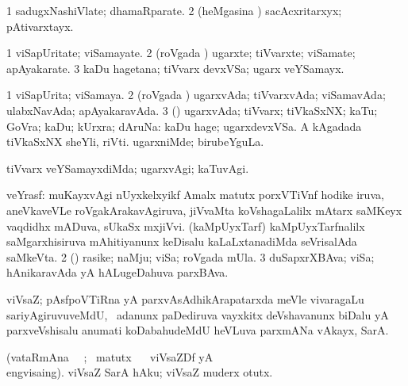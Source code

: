 \bentry 
{} 
\gl{\nA}
\expl{}
\bmng
\bnum
\num{1} sadugxNashiVlate; dhamaRparate. 
\num{2} (heMgasina \vi) sacAcxritarxyx; pAtivarxtayx. 
\enum
\emng
\eentry

\bentry 
{} 
\gl{\nA}
\expl{}
\bmng
\bnum
\num{1} viSapUritate; viSamayate. 
\num{2} (roVgada \vi) ugarxte; tiVvarxte; viSamate; apAyakarate. 
\num{3} kaDu hagetana; tiVvarx devxVSa; ugarx veYSamayx. 
\enum
\emng
\eentry

\bentry
{} 
\gl{\gu}
\expl{}
\bmng
\bnum
\num{1} viSapUrita; viSamaya. 
\num{2} (roVgada \vi) ugarxvAda; tiVvarxvAda; viSamavAda; ulabxNavAda; apAyakaravAda. 
\num{3} (\rUpa) ugarxvAda; tiVvarx; tiVkaSxNX; kaTu; GoVra; kaDu; kUrxra; dAruNa:  kaDu hage; ugarxdevxVSa.  A kAgadada tiVkaSxNX sheYli, riVti.  ugarxniMde; birubeYguLa. 
\enum
\emng
\eentry

\bentry 
{} 
\gl{\kirxvi}
\expl{}
\bmng
 tiVvarx veYSamayxdiMda; ugarxvAgi; kaTuvAgi. 
\emng
\eentry

\bentry 
{} 
\gl{\nA}
\expl{}
\bmng
\bnum
{} 
\banum
{} veYrasf: muKayxvAgi nUyxkelxyikf Amalx matutx porxVTiVnf hodike iruva, aneVkaveVLe roVgakArakavAgiruva, jiVvaMta koVshagaLalilx mAtarx saMKeyx vaqdidhx mADuva, sUkaSx mxjiVvi. 
 (kaMpUyxTarf) kaMpUyxTarfnalilx saMgarxhisiruva mAhitiyanunx keDisalu kaLaLxtanadiMda seVrisalAda saMkeVta. 
\eanum
\numie
\num{2} (\pArxparx) rasike; naMju; viSa; roVgada mUla. 
\num{3} duSapxrXBAva; viSa; hAnikaravAda yA hALugeDahuva parxBAva. 
\enum
\emng
\eentry

\bentry
{}
\gl{\saMkiSx}
\expl{}
\bmng
{} 
\emng
\eentry

\bentry
{} 
\gl{\nA}
\expl{}
\bmng
 viVsaZ; pAsfpoVTiRna yA parxvAsAdhikArapatarxda meVle vivaragaLu sariyAgiruvuveMdU, \kanmu\ adanunx paDediruva vayxkitx deVshavanunx biDalu yA parxveVshisalu anumati koDabahudeMdU heVLuva parxmANa vAkayx, SarA. 
\emng
\eentry

\bentry 
{} 
\gl{\sakirx}(vataRmAna \parxpu\ \Eva\ ; \BU\ matutx 
\BUkaq\  \ucAcx\ viVsaZDf yA  \vakaq\\eng{visaing}). \bmng
 viVsaZ SarA hAku; viVsaZ muderx otutx. 
\emng
\eentry

